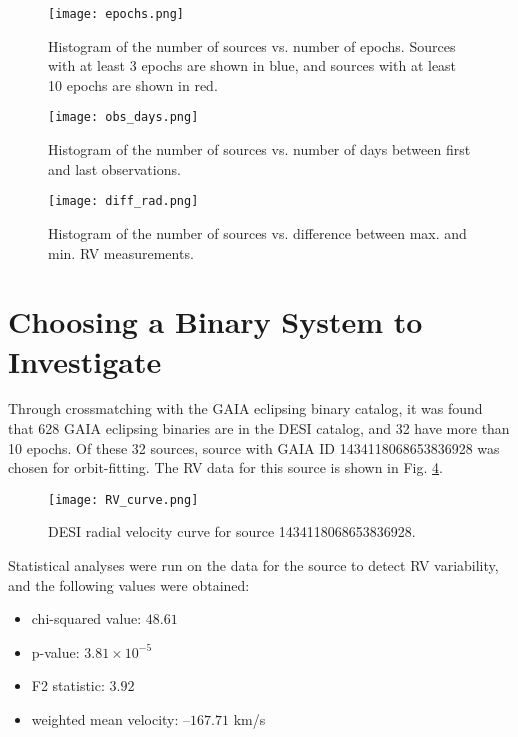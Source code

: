 \documentclass[12pt,a4paper]{article}
\begin{document}
\begin{figure}[htbp!]
\begin{center}
\texttt{[image: epochs.png]}
\end{center}
\caption{Histogram of the number of sources vs. number of epochs. Sources with at least 3 epochs are shown in blue, and sources with at least 10 epochs are shown in red.}
\label{fig:epochs}
\end{figure}

\begin{figure}[htbp!]
\begin{center}
\texttt{[image: obs\_days.png]}
\end{center}
\caption{Histogram of the number of sources vs. number of days between first and last observations.}
\label{fig:obs_days}
\end{figure}

\begin{figure}[htbp!]
\begin{center}
\texttt{[image: diff\_rad.png]}
\end{center}
\caption{Histogram of the number of sources vs. difference between max. and min. RV measurements.}
\label{fig:diff_rad}
\end{figure}

\section{Choosing a Binary System to Investigate}
Through crossmatching with the GAIA eclipsing binary catalog, it was found that 628 GAIA eclipsing binaries are in the DESI catalog, and 32 have more than 10 epochs. Of these 32 sources, source with GAIA ID 1434118068653836928 was chosen for orbit-fitting. The RV data for this source is shown in Fig. \ref{fig:RV_curve}.

\begin{figure}[htbp!]
\begin{center}
\texttt{[image: RV\_curve.png]}
\end{center}
\caption{DESI radial velocity curve for source 1434118068653836928.}
\label{fig:RV_curve}
\end{figure}

Statistical analyses were run on the data for the source to detect RV variability, and the following values were obtained:
\begin{itemize}
  \item chi-squared value: $48.61$
  \item p-value: $3.81 \times 10^{-5}$
  \item F2 statistic: $3.92$
  \item weighted mean velocity: $–167.71$ km/s
\end{itemize}
\end{document}
